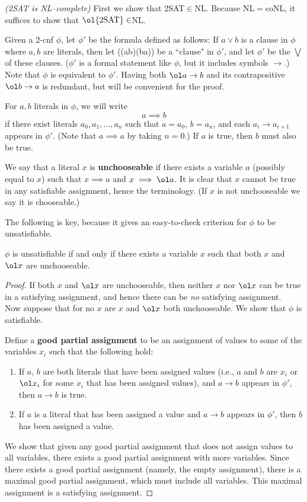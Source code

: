 \begin{problem}{\it(2SAT is NL--complete)}
First we show that 2SAT$\in$NL. Because NL$=$coNL, it suffices to show that $\ol{\text{2SAT}}\in$NL.

Given a 2-cnf $\phi$, let $\phi'$ be the formula defined as follows: If $a\vee b$ is a clause in $\phi$ where $a,b$ are literals, then let
((\ol a\to b)\wedge (\ol b\to a))
\eeq
be a ``clause" in $\phi'$, and let $\phi'$ be the $\bigvee$ of these clauses. ($\phi'$ is a formal statement like $\phi$, but it includes symbols $\to$.) Note that $\phi$ is equivalent to $\phi'$. Having both $\ol a\to b$ and its contrapositive $\ol b\to a$ is redundant, but will be convenient for the proof.

For $a,b$ literals in $\phi$, we will write
\[
a\implies b
\]
if there exist literals $a_0,a_1,\ldots, a_n$ such that $a=a_0$, $b=a_n$, and each $a_i\to a_{i+1}$ appears in $\phi'$. (Note that $a\implies a$ by taking $n=0$.) If $a$ is true, then $b$ must also be true.

We say that a literal $x$ is \textbf{unchooseable} if there exists a variable $a$ (possibly equal to $x$) such that $x\implies a$ and $x\implies \ol a$. It is clear that $x$ cannot be true in any satisfiable assignment, hence the terminology. (If $x$ is not unchooseable we say it is chooseable.)

The following is key, because it gives an easy-to-check criterion for $\phi$ to be unsatisfiable.
\begin{lem}
$\phi$ is unsatisfiable if and only if there exists a variable $x$ such that both $x$ and $\ol x$ are unchooseable.
\end{lem}
\begin{proof}
If both $x$ and $\ol x$ are unchooseable, then neither $x$ nor $\ol x$ can be true in a satisfying assignment, and hence there can be {\it no} satisfying assignment.\\


Now suppose that for no $x$ are $x$ and $\ol x$ both unchooseable. We show that $\phi$ is satisfiable. 

Define a \textbf{good partial assignment} to be an assignment of values to some of the variables $x_i$ such that the following hold:
\begin{enumerate}
\item
If $a$, $b$ are both literals that have been assigned values (i.e., $a$ and $b$ are $x_i$ or $\ol x_i$ for some $x_i$ that has been assigned values), and $a\to b$ appears in $\phi'$, then $a\to b$ is true.
\item 
If $a$ is a literal that has been assigned a value and $a\to b$ appears in $\phi'$, then $b$ has been assigned a value.
\end{enumerate}
We show that given any good partial assignment that does not assign values to all variables, there exists a good partial assignment with more variables. Since there exists a good partial assignment (namely, the empty assignment), there is a maximal good partial assignment, which must include all variables. This maximal assignment is a satisfying assignment.


\end{proof}
\end{problem}
